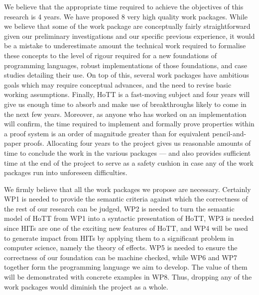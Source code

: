 \documentclass[a4paper,11pt]{article}
\begin{document}

\vspace{0.02in}

 We believe that the appropriate
time required to achieve the objectives of this research is 4
years. We have proposed 8 very high quality work packages. While we
believe that some of the work package are conceptually fairly
straightforward given our preliminary investigations and our specific
previous experience, it would be a mistake to underestimate amount the
technical work required to formalise these concepts to the level of
rigour required for a new foundations of programming languages,
robust implementations of those foundations, and case studies
detailing their use. On top of this, several work packages have
ambitious goals 
which may require conceptual
advances,  and the need to revise basic working assumptions. Finally,
HoTT is a fast-moving subject and four years will give us enough time
to absorb and make use of breakthroughs likely to come in the next few
years. Moreover, as anyone who has worked on an implementation will
confirm, the time required to implement and formally prove properties
within a proof system is an order of magnitude greater than for
equivalent pencil-and-paper proofs. Allocating four years to the
project gives us reasonable amounts of time to conclude the work in
the various packages
--- and also
provides sufficient time at the end of the project to serve as a
safety cushion in case any of the work packages run into unforeseen
difficulties.

We firmly believe that all the work packages we propose are
necessary. Certainly WP1 is needed to provide the semantic criteria
against which the correctness of the rest of our research can be
judged, WP2 is needed to turn the semantic model of HoTT from WP1 into
a syntactic presentation of HoTT, WP3 is needed since HITs are one of
the exciting new features of HoTT, and WP4 will be used to generate
impact from HITs by applying them to a significant problem in computer
science, namely the theory of effects. WP5 is needed to ensure the
correctness of our foundation can be machine checked, while WP6 and WP7 
together form the programming language we aim to develop. The value of
them will be demonstrated with concrete examples in WP8.
Thus, dropping any of the work packages would diminish the project as a whole.
\end{document}
